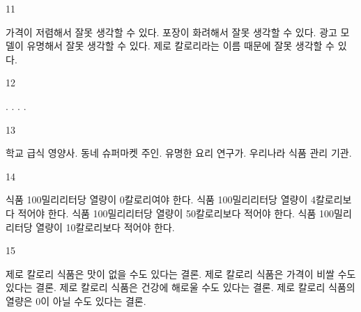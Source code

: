 \documentclass[fs9,seriesFre]{korfarm-base}
\begin{document}
\begin{kfSentenceUnit}{11}{}
\begin{kfChoices}
\kfChoice 가격이 저렴해서 잘못 생각할 수 있다.
\kfChoice 포장이 화려해서 잘못 생각할 수 있다.
\kfChoice 광고 모델이 유명해서 잘못 생각할 수 있다.
\kfChoice 제로 칼로리라는 이름 때문에 잘못 생각할 수 있다.
\end{kfChoices}
\end{kfSentenceUnit}

\begin{kfSentenceUnit}{12}{}
\begin{kfChoices}
.
.
.
.
\end{kfChoices}
\end{kfSentenceUnit}

\begin{kfSentenceUnit}{13}{}
\begin{kfChoices}
\kfChoice 학교 급식 영양사.
\kfChoice 동네 슈퍼마켓 주인.
\kfChoice 유명한 요리 연구가.
\kfChoice 우리나라 식품 관리 기관.
\end{kfChoices}
\end{kfSentenceUnit}

\begin{kfSentenceUnit}{14}{}
\begin{kfChoices}
\kfChoice 식품 100밀리리터당 열량이 0칼로리여야 한다.
\kfChoice 식품 100밀리리터당 열량이 4칼로리보다 적어야 한다.
\kfChoice 식품 100밀리리터당 열량이 50칼로리보다 적어야 한다.
\kfChoice 식품 100밀리리터당 열량이 10칼로리보다 적어야 한다.
\end{kfChoices}
\end{kfSentenceUnit}

\begin{kfSentenceUnit}{15}{}
\begin{kfChoices}
\kfChoice 제로 칼로리 식품은 맛이 없을 수도 있다는 결론.
\kfChoice 제로 칼로리 식품은 가격이 비쌀 수도 있다는 결론.
\kfChoice 제로 칼로리 식품은 건강에 해로울 수도 있다는 결론.
\kfChoice 제로 칼로리 식품의 열량은 0이 아닐 수도 있다는 결론.
\end{kfChoices}
\end{kfSentenceUnit}
\end{document}
